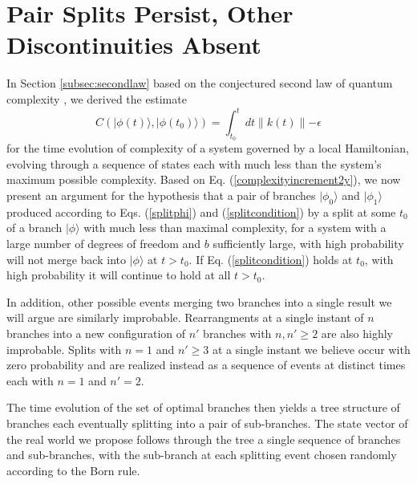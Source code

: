 \documentclass[twocolumn,amsmath,amssymb]{revtex4-1}
\begin{document}
\section{\label{sec:secondlaw} Pair Splits Persist, Other Discontinuities Absent}

In Section \ref{subsec:secondlaw}
based on the conjectured second law of quantum
complexity \cite{Susskind}, we derived the estimate
\begin{equation}
  \label{complexityincrement2y}
  C( |\phi(t) \rangle , |\phi(t_0) \rangle ) = \int_{t_0}^t dt \parallel k(t) \parallel - \epsilon
\end{equation}
for the time evolution of complexity of a system
governed by a local Hamiltonian,
evolving through a sequence of states
each with much less than
the system's maximum possible complexity.
Based on Eq. (\ref{complexityincrement2y}),
we now present an argument for the hypothesis that
a pair of branches $|\phi_0 \rangle $ and $|\phi_1 \rangle $
produced according to Eqs. (\ref{splitphi})
and (\ref{splitcondition}) by
a split  at some $t_0$ of a branch $|\phi \rangle $ with much less than maximal complexity,
for a system with a large number of degrees of freedom and $b$ sufficiently large,
with high probability will not merge back
into $|\phi \rangle $
at $t > t_0$.
If Eq. (\ref{splitcondition})
holds at $t_0$, with high probability it will 
continue to hold
at all
$t > t_0$.

In addition, 
other possible events merging two branches
into a single result 
we will argue are similarly improbable.
Rearrangments at a single instant of $n$ branches into
a new configuration of $n'$ branches with $n, n' \ge 2$
are also highly improbable.
Splits with $n = 1$ and $n' \ge 3$ at a single instant
we believe occur with zero probability and
are realized instead as a sequence of events at distinct times
each with $n = 1$ and $n' = 2$.

The time evolution of the set of optimal branches then
yields a tree structure of branches each eventually splitting
into a pair of sub-branches.  The state vector of the real world
we propose follows through the tree a single sequence of
branches and sub-branches, with the sub-branch at each splitting
event chosen randomly according to the Born rule.
\end{document}
